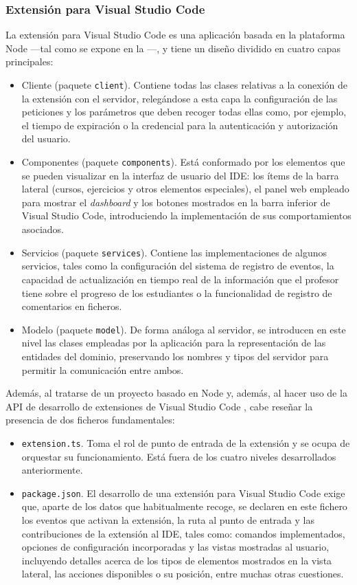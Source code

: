 \subsubsection{Extensión para Visual Studio Code}
\label{subsec:arqCliente}
La extensión para Visual Studio Code es una aplicación basada en la plataforma Node ---tal como se expone en la ---, y tiene un diseño dividido en cuatro capas principales:
\begin{itemize}
    \item Cliente (paquete \texttt{client}). Contiene todas las clases relativas a la conexión de la extensión con el servidor, relegándose a esta capa la configuración de las peticiones y los parámetros que deben recoger todas ellas como, por ejemplo, el tiempo de expiración o la credencial para la autenticación y autorización del usuario.
    \item Componentes (paquete \texttt{components}). Está conformado por los elementos que se pueden visualizar en la interfaz de usuario del IDE: los ítems de la barra lateral (cursos, ejercicios y otros elementos especiales), el panel web empleado para mostrar el \textit{dashboard} y los botones mostrados en la barra inferior de Visual Studio Code, introduciendo la implementación de sus comportamientos asociados.
    \item Servicios (paquete \texttt{services}). Contiene las implementaciones de algunos servicios, tales como la configuración del sistema de registro de eventos, la capacidad de actualización en tiempo real de la información que el profesor tiene sobre el progreso de los estudiantes o la funcionalidad de registro de comentarios en ficheros.
    \item Modelo (paquete \texttt{model}). De forma análoga al servidor, se introducen en este nivel las clases empleadas por la aplicación para la representación de las entidades del dominio, preservando los nombres y tipos del servidor para permitir la comunicación entre ambos.
\end{itemize}

Además, al tratarse de un proyecto basado en Node y, además, al hacer uso de la API de desarrollo de extensiones de Visual Studio Code \cite{Tec_VSCodeExtAPI}, cabe reseñar la presencia de dos ficheros fundamentales:
\begin{itemize}
    \item \texttt{extension.ts}. Toma el rol de punto de entrada de la extensión y se ocupa de orquestar su funcionamiento. Está fuera de los cuatro niveles desarrollados anteriormente.
    \item \texttt{package.json}. El desarrollo de una extensión para Visual Studio Code exige que, aparte de los datos que habitualmente recoge, se declaren en este fichero los eventos que activan la extensión, la ruta al punto de entrada y las contribuciones de la extensión al IDE, tales como: comandos implementados, opciones de configuración incorporadas y las vistas mostradas al usuario, incluyendo detalles acerca de los tipos de elementos mostrados en la vista lateral, las acciones disponibles o su posición, entre muchas otras cuestiones.
\end{itemize}

